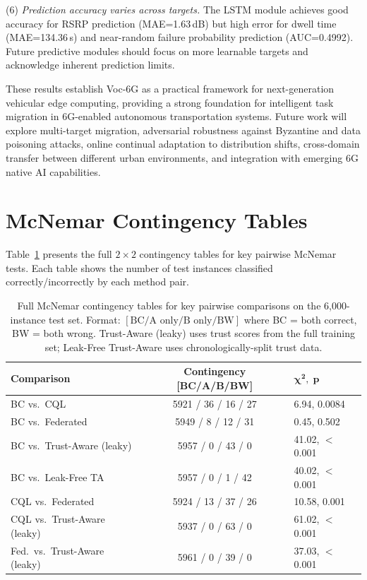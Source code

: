 \documentclass[journal,twoside]{IEEEtran}
\newcommand{\VocSixG}{Voc-6G}
\begin{document}
(6) \textit{Prediction accuracy varies across targets.} The LSTM module achieves good accuracy for RSRP prediction (MAE=1.63\,dB) but high error for dwell time (MAE=134.36\,s) and near-random failure probability prediction (AUC=0.4992). Future predictive modules should focus on more learnable targets and acknowledge inherent prediction limits.

These results establish \VocSixG{} as a practical framework for next-generation vehicular edge computing, providing a strong foundation for intelligent task migration in 6G-enabled autonomous transportation systems. Future work will explore multi-target migration, adversarial robustness against Byzantine and data poisoning attacks, online continual adaptation to distribution shifts, cross-domain transfer between different urban environments, and integration with emerging 6G native AI capabilities.


\appendices
\section{McNemar Contingency Tables}
\label{app:mcnemar}

Table~\ref{tab:mcnemar} presents the full $2 \times 2$ contingency tables for key pairwise McNemar tests. Each table shows the number of test instances classified correctly/incorrectly by each method pair.

\begin{table}[t]
\centering
\caption{Full McNemar contingency tables for key pairwise comparisons on the 6,000-instance test set. Format: $[\text{BC} / \text{A only} / \text{B only} / \text{BW}]$ where BC = both correct, BW = both wrong. Trust-Aware (leaky) uses trust scores from the full training set; Leak-Free Trust-Aware uses chronologically-split trust data.}
\label{tab:mcnemar}
\footnotesize
\begin{tabular}{lcl}
\toprule
\textbf{Comparison} & \textbf{Contingency [BC/A/B/BW]} & $\boldsymbol{\chi^2,\; p}$ \\
\midrule
BC vs.\ CQL         & 5921 / 36 / 16 / 27        & 6.94, 0.0084 \\
BC vs.\ Federated   & 5949 / 8 / 12 / 31         & 0.45, 0.502 \\
BC vs.\ Trust-Aware (leaky) & 5957 / 0 / 43 / 0 & 41.02, $<$0.001 \\
BC vs.\ Leak-Free TA       & 5957 / 0 / 1 / 42  & 40.02, $<$0.001 \\
CQL vs.\ Federated   & 5924 / 13 / 37 / 26       & 10.58, 0.001 \\
CQL vs.\ Trust-Aware (leaky) & 5937 / 0 / 63 / 0 & 61.02, $<$0.001 \\
Fed.\ vs.\ Trust-Aware (leaky) & 5961 / 0 / 39 / 0 & 37.03, $<$0.001 \\
\bottomrule
\end{tabular}
\end{table}




\end{document}

